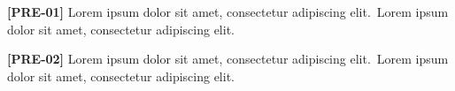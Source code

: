 \documentclass[twocolumn]{article}
\newcommand\Body{Lorem ipsum dolor sit amet, consectetur adipiscing elit.}
\newcommand\Par[1]{\par\textbf{[#1]} \Body\ \Body\par\medskip}
\begin{document}
\Par{PRE-01}\Par{PRE-02}
\begin{wideband}[rules=none]
  \centering{}
\end{wideband}
\end{document}
